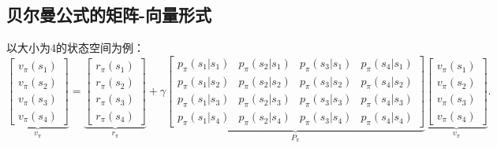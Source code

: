 \documentclass{article}
\begin{document}
\subsection{贝尔曼公式的矩阵-向量形式}
以大小为4的状态空间为例：
\[
\underbrace{
  \begin{bmatrix}
    v_{\pi}(s_1) \\
    v_{\pi}(s_2) \\
    v_{\pi}(s_3) \\
    v_{\pi}(s_4)
  \end{bmatrix}
}_{v_{\pi}}
=
\underbrace{
  \begin{bmatrix}
    r_{\pi}(s_1) \\
    r_{\pi}(s_2) \\
    r_{\pi}(s_3) \\
    r_{\pi}(s_4)
  \end{bmatrix}
}_{r_{\pi}}
+ \gamma
\underbrace{
  \begin{bmatrix}
    p_{\pi}(s_1|s_1) & p_{\pi}(s_2|s_1) & p_{\pi}(s_3|s_1) & p_{\pi}(s_4|s_1) \\
    p_{\pi}(s_1|s_2) & p_{\pi}(s_2|s_2) & p_{\pi}(s_3|s_2) & p_{\pi}(s_4|s_2) \\
    p_{\pi}(s_1|s_3) & p_{\pi}(s_2|s_3) & p_{\pi}(s_3|s_3) & p_{\pi}(s_4|s_3) \\
    p_{\pi}(s_1|s_4) & p_{\pi}(s_2|s_4) & p_{\pi}(s_3|s_4) & p_{\pi}(s_4|s_4)
  \end{bmatrix}
}_{P_{\pi}}
\underbrace{
  \begin{bmatrix}
    v_{\pi}(s_1) \\
    v_{\pi}(s_2) \\
    v_{\pi}(s_3) \\
    v_{\pi}(s_4)
  \end{bmatrix}
}_{v_{\pi}}.
\]
\end{document}
